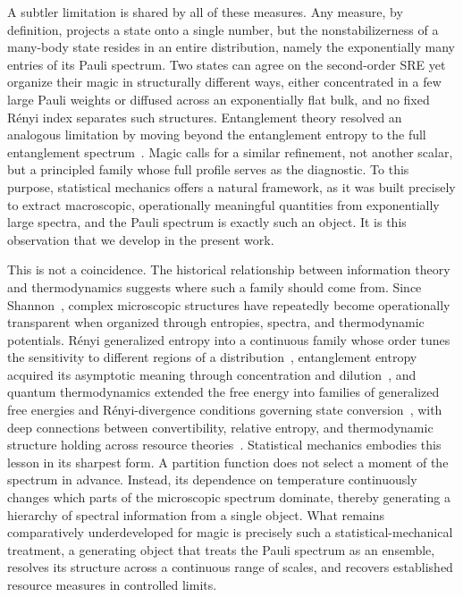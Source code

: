 \documentclass[aps,pra,superscriptaddress,twocolumn,longbibliography]{revtex4-2}
\begin{document}
A subtler limitation is shared by all of these measures. Any measure, by definition, projects a state onto a single number, but the nonstabilizerness of a many-body state resides in an entire distribution, namely the exponentially many entries of its Pauli spectrum. Two states can agree on the second-order SRE yet organize their magic in structurally different ways, either concentrated in a few large Pauli weights or diffused across an exponentially flat bulk, and no fixed R\'enyi index separates such structures. 
Entanglement theory resolved an analogous limitation by moving beyond the entanglement entropy to the full entanglement spectrum~\cite{Li_Haldane/Entanglement_Spectrum/2008}. 
Magic calls for a similar refinement, not another scalar, but a principled family whose full profile serves as the diagnostic.
To this purpose, statistical mechanics offers a natural framework, as it was built precisely to extract macroscopic, operationally meaningful quantities from exponentially large spectra, and the Pauli spectrum is exactly such an object.
It is this observation that we develop in the present work.

This is not a coincidence. 
The historical relationship between information theory and thermodynamics suggests where such a family should come from. Since Shannon~\cite{Shannon1948}, complex microscopic structures have repeatedly become operationally transparent when organized through entropies, spectra, and thermodynamic potentials. R\'enyi generalized entropy into a continuous family whose order tunes the sensitivity to different regions of a distribution~\cite{Renyi1961}, entanglement entropy acquired its asymptotic meaning through concentration and dilution~\cite{BennettEtAl1996Entanglement}, and quantum thermodynamics extended the free energy into families of generalized free energies and R\'enyi-divergence conditions governing state conversion~\cite{HorodeckiOppenheim2013,BrandaoEtAl2015SecondLaws}, with deep connections between convertibility, relative entropy, and thermodynamic structure holding across resource theories~\cite{BrandaoGour2015ResourceTheories}. 
Statistical mechanics embodies this lesson in its sharpest form. A partition function does not select a moment of the spectrum in advance.
Instead, its dependence on temperature continuously changes which parts of the microscopic spectrum dominate, thereby generating a hierarchy of spectral information from a single object. 
What remains comparatively underdeveloped for magic is precisely such a statistical-mechanical treatment, a generating object that treats the Pauli spectrum as an ensemble, resolves its structure across a continuous range of scales, and recovers established resource measures in controlled limits.
\end{document}
